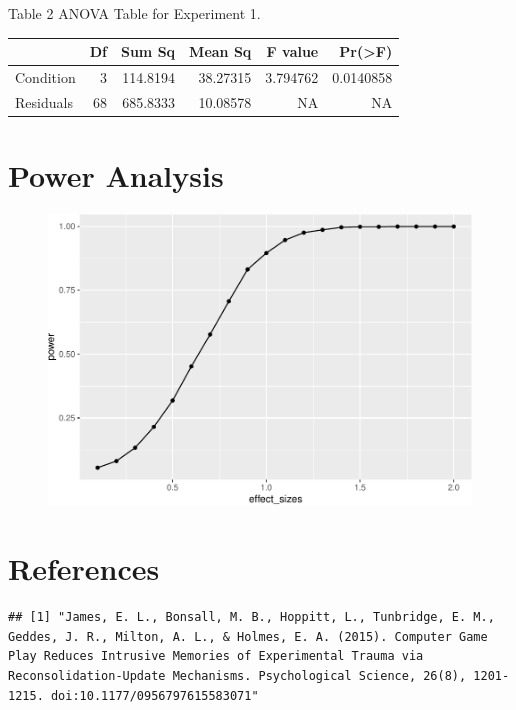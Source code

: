 \documentclass[man]{apa6}
\begin{document}
Table 2 ANOVA Table for Experiment 1.

\begin{tabular}{l|r|r|r|r|r}
\hline
  & Df & Sum Sq & Mean Sq & F value & Pr(>F)\\
\hline
Condition & 3 & 114.8194 & 38.27315 & 3.794762 & 0.0140858\\
\hline
Residuals & 68 & 685.8333 & 10.08578 & NA & NA\\
\hline
\end{tabular}

\newpage 

\section{Power Analysis}\label{power-analysis}

\begin{figure}
\centering
\includegraphics{testMidterm_files/figure-latex/unnamed-chunk-5-1.pdf}
\caption{}
\end{figure}

\newpage

\section{References}\label{references}

\begin{verbatim}
## [1] "James, E. L., Bonsall, M. B., Hoppitt, L., Tunbridge, E. M., Geddes, J. R., Milton, A. L., & Holmes, E. A. (2015). Computer Game Play Reduces Intrusive Memories of Experimental Trauma via Reconsolidation-Update Mechanisms. Psychological Science, 26(8), 1201-1215. doi:10.1177/0956797615583071"
\end{verbatim}

\begingroup
\setlength{\parindent}{-0.5in} \setlength{\leftskip}{0.5in}

\hypertarget{refs}{}

\endgroup
\end{document}
